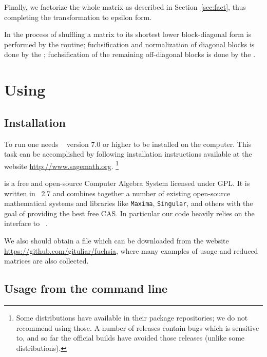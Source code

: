 \documentclass[12pt,a4paper]{article}
\begin{document}
Finally, we factorize the whole matrix as described in Section~\ref{sec:fact}, thus completing the transformation to epsilon form.

In \fuchsia the process of shuffling a matrix to its shortest lower block-diagonal form is performed by the  routine; fuchsification and normalization of diagonal blocks is done by the ; fuchsification of the remaining off-diagonal blocks is done by the .


\section{Using \fuchsia}
\label{sec:3}

\subsection{Installation}

To run \fuchsia one needs \sage~\cite{sagemath} version 7.0 or higher to be installed on the computer.
This task can be accomplished by following installation instructions available at the website \url{http://www.sagemath.org}.
\footnote{
    Some \linux distributions have \sage available in their package repositories; we do not recommend using those.
    A number of \maxima releases contain bugs which \fuchsia is sensitive to, and so far the official \sage builds have avoided those releases (unlike some \linux distributions).
}

\sage is a free and open-source Computer Algebra System licensed under GPL.
It is written in \python~2.7 and combines together a number of existing open-source mathematical systems and libraries like \texttt{Maxima}, \texttt{Singular}, and others with the goal of providing the best free CAS.
In particular our code heavily relies on the interface to \maxima~\cite{maxima}.

We also should obtain a file  which can be downloaded from the website \url{https://github.com/gituliar/fuchsia}, where many examples of usage and reduced matrices are also collected.


\vspace{10mm}

\subsection{Usage from the command line}
\end{document}
